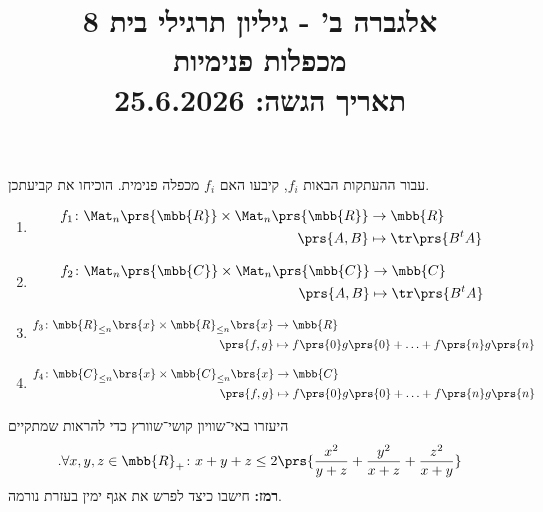 \documentclass[a4paper,10pt,twoside,openany]{article}
\title{
אלגברה ב' - גיליון תרגילי בית 8 \\
מכפלות פנימיות
\\
\vspace{1cm}
\large{תאריך הגשה: 25.6.2026}
}
\date{}
\begin{document}
\maketitle

\begin{exercise}
עבור ההעתקות הבאות $f_i$, קיבעו האם $f_i$ מכפלה פנימית. הוכיחו את קביעתכן.

\begin{enumerate}
\item
\begin{align*}
f_1 \colon \Mat_n\prs{\mbb{R}} \times \Mat_n\prs{\mbb{R}} &\to \mbb{R} \\
\prs{A,B} &\mapsto \tr\prs{B^t A}
\end{align*}

\item
\begin{align*}
f_2 \colon \Mat_n\prs{\mbb{C}} \times \Mat_n\prs{\mbb{C}} &\to \mbb{C} \\
\prs{A,B} &\mapsto \tr\prs{B^t A}
\end{align*}

\item
\begin{align*}
f_3 \colon \mbb{R}_{\leq n}\brs{x} \times \mbb{R}_{\leq n}\brs{x} &\to \mbb{R} \\
\prs{f,g} &\mapsto f\prs{0} g\prs{0} + \ldots + f\prs{n} g\prs{n}
\end{align*}

\item
\begin{align*}
f_4 \colon \mbb{C}_{\leq n}\brs{x} \times \mbb{C}_{\leq n}\brs{x} &\to \mbb{C} \\
\prs{f,g} &\mapsto f\prs{0} g\prs{0} + \ldots + f\prs{n} g\prs{n}
\end{align*}
\end{enumerate}
\end{exercise}

\begin{exercise}
היעזרו באי־שוויון קושי־שוורץ כדי להראות שמתקיים
\[\text{.} \forall x,y,z \in \mbb{R}_+ \colon x + y + z \leq 2 \prs{\frac{x^2}{y+z} + \frac{y^2}{x+z} + \frac{z^2}{x+y}}\]
\textbf{רמז:}
חישבו כיצד לפרש את אגף ימין בעזרת נורמה.
\end{exercise}
\end{document}

